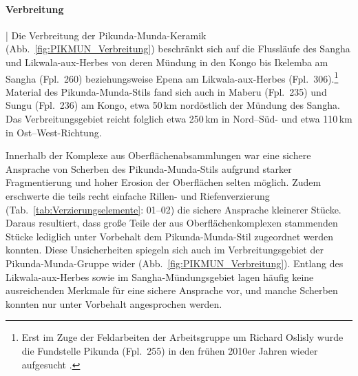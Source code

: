 \paragraph{Verbreitung}\hspace{-.5em}|\hspace{.5em}%
Die Verbreitung der Pikunda-Munda-Keramik (Abb.~\ref{fig:PIKMUN_Verbreitung}) beschränkt sich auf die Flussläufe des \mbox{Sangha} und \mbox{Likwala}-\mbox{aux}-\mbox{Herbes} von deren Mündung in den Kongo bis Ikelemba am \mbox{Sangha} (Fpl.~260) beziehungsweise Epena am \mbox{Likwala}-\mbox{aux}-\mbox{Herbes} (Fpl.~306).\footnote{Erst im Zuge der Feldarbeiten der Arbeitsgruppe um Richard Oslisly wurde die Fundstelle Pikunda (Fpl.~255) in den frühen 2010er Jahren wieder aufgesucht \parencite[211 Abb.~1, 212\,f. Tab.~1 Nr.~25--26]{MorinRivat.2014}.} Material des Pikunda-Munda-Stils fand sich auch in Maberu (Fpl.~235) und Sungu (Fpl.~236) am Kongo, etwa 50\,km nordöstlich der Mündung des \mbox{Sangha}. Das Verbreitungsgebiet reicht folglich etwa 250\,km in Nord--Süd- und etwa 110\,km in Ost--West-Richtung.

Innerhalb der Komplexe aus Oberflächenabsammlungen war eine sichere Ansprache von Scherben des Pikunda-Munda-Stils aufgrund starker Fragmentierung und hoher Erosion der Oberflächen selten möglich. Zudem erschwerte die teils recht einfache Rillen- und Riefenverzierung (Tab.~\ref{tab:Verzierungselemente}: 01--02) die sichere Ansprache kleinerer Stücke. Daraus resultiert, dass große Teile der aus Oberflächenkomplexen stammenden Stücke lediglich unter Vorbehalt dem Pikunda-Munda-Stil zugeordnet werden konnten. Diese Unsicherheiten spiegeln sich auch im Verbreitungsgebiet der Pikunda-Munda-Gruppe wider (Abb.~\ref{fig:PIKMUN_Verbreitung}). Entlang des \mbox{Likwala}-\mbox{aux}-\mbox{Herbes} sowie im \mbox{Sangha}-Mündungsgebiet lagen häufig keine ausreichenden Merkmale für eine sichere Ansprache vor, und manche Scherben konnten nur unter Vorbehalt angesprochen werden.

